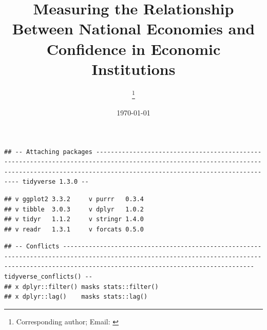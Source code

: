 \documentclass[12pt,halfline,a4paper,]{ouparticle}
\begin{document}
\title{Measuring the Relationship Between National Economies and Confidence in
Economic Institutions}

\author{%
\address{Department of Anthropology, University of Georgia}
\and
{}\address{Department of Political Science, University of Georgia}\thanks{Corresponding author; Email: \href{mailto:}{}}
}


\date{\today}


\maketitle



\begin{verbatim}
## -- Attaching packages --------------------------------------------------------------------------------------------------------------------------------------------------------------------------------------------- tidyverse 1.3.0 --
\end{verbatim}

\begin{verbatim}
## v ggplot2 3.3.2     v purrr   0.3.4
## v tibble  3.0.3     v dplyr   1.0.2
## v tidyr   1.1.2     v stringr 1.4.0
## v readr   1.3.1     v forcats 0.5.0
\end{verbatim}

\begin{verbatim}
## -- Conflicts ------------------------------------------------------------------------------------------------------------------------------------------------------------------------------------------------ tidyverse_conflicts() --
## x dplyr::filter() masks stats::filter()
## x dplyr::lag()    masks stats::lag()
\end{verbatim}
\end{document}
